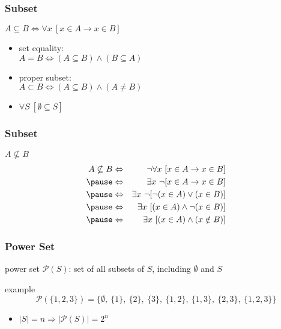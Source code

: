 \documentclass[dvipsnames]{beamer}
\begin{document}
\begin{frame}
  \frametitle{Subset}

  \begin{definition}
    $A \subseteq B \Leftrightarrow \forall x~[x \in A \rightarrow x \in B]$
  \end{definition}

  \pause
  \begin{itemize}
    \item \alert{set equality}:\\
      $A = B \Leftrightarrow (A \subseteq B) \wedge (B \subseteq A)$

    \item \alert{proper subset}:\\
      $A \subset B \Leftrightarrow (A \subseteq B) \wedge (A \neq B)$

    \pause
    \medskip
    \item $\forall S~[\emptyset \subseteq S]$
  \end{itemize}
\end{frame}

\begin{frame}
  \frametitle{Subset}

  \begin{block}{$A \nsubseteq B$}
    \begin{eqnarray*}
      A \nsubseteq B & \Leftrightarrow
                     & \neg \forall x~[x \in A \rightarrow x \in B]\\\pause
                     & \Leftrightarrow
                     & \exists x~\neg [x \in A \rightarrow x \in B]\\\pause
                     & \Leftrightarrow
                     & \exists x~\neg [\neg (x \in A) \vee (x \in B)]\\\pause
                     & \Leftrightarrow
                     & \exists x~[(x \in A) \wedge \neg (x \in B)]\\\pause
                     & \Leftrightarrow
                     & \exists x~[(x \in A) \wedge (x \notin B)]
    \end{eqnarray*}
  \end{block}
\end{frame}

\begin{frame}
  \frametitle{Power Set}

  \begin{definition}
    \alert{power set} $\mathcal{P}(S)$: set of all subsets of $S$,
    including $\emptyset$ and $S$
  \end{definition}

  \begin{exampleblock}{example}
    \vspace{-2em}
    \[
      \mathcal{P}(\{1,2,3\}) =
        \{\emptyset,~\{1\},~\{2\},
          ~\{3\},~\{1,2\},~\{1,3\},~\{2,3\},~\{1,2,3\}\}
    \]
  \end{exampleblock}

  \pause
  \begin{itemize}
    \item $|S|=n \Rightarrow |\mathcal{P}(S)|=2^n$
  \end{itemize}
\end{frame}
\end{document}
